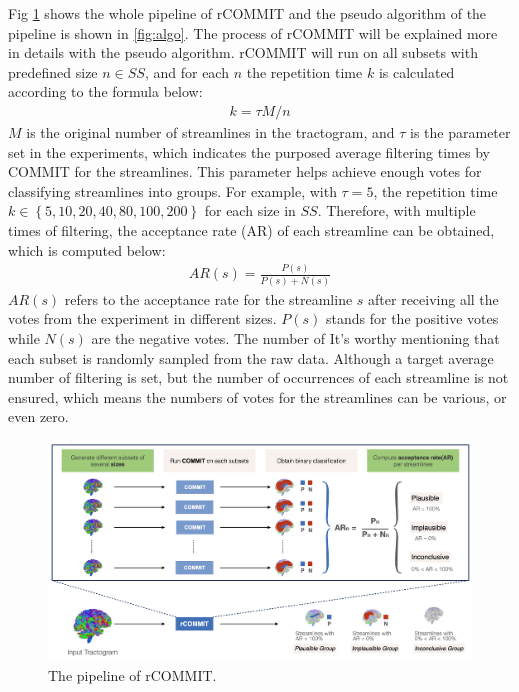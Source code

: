 Fig \ref{fig:pipe} shows the whole pipeline of rCOMMIT and the pseudo algorithm of the pipeline is shown in \ref{fig:algo}. 
The process of rCOMMIT will be explained more in details with the pseudo algorithm. rCOMMIT will run on all subsets with predefined
size $n \in SS$, and for each $n$ the repetition time $k$ is calculated according to the formula below:
\begin{gather}\label{computek}  
    k = \tau M/n
\end{gather}
$M$ is the original number of streamlines in the tractogram, and $\tau$ is the parameter set in the experiments, 
which indicates the purposed average filtering times by COMMIT for the streamlines. This parameter helps achieve enough votes for classifying streamlines into groups.
For example, with $\tau=5$, the repetition time $k \in \left \{5, 10, 20, 40, 80, 100, 200 \right \}$ for each size in $SS$.
Therefore, with multiple times of filtering, the acceptance rate (AR) of each streamline can be obtained, which is computed below:
\begin{gather}\label{AR}
    AR(s) = \frac{P(s)}{P(s)+ N(s)}
\end{gather}
$AR(s)$ refers to the acceptance rate for the streamline $s$ after receiving all the votes from the experiment in different sizes.
$P(s)$ stands for the positive votes while $N(s)$ are the negative votes.
 The number of 
It's worthy mentioning that each subset is randomly sampled from the raw data. 
Although a target average number of filtering is set, but the number of occurrences of each streamline is not ensured, 
which means the numbers of votes for the streamlines can be various, or even zero.




\begin{figure}[ht]
    \centering
    \includegraphics[width= 16cm]{figures/pipe.jpg}
        \caption{The pipeline of rCOMMIT. 
        }
    \label{fig:pipe}
\end{figure}



